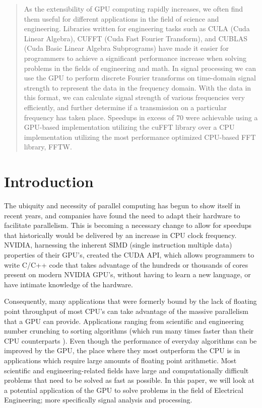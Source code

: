 \documentclass[conference]{IEEEtran}
\begin{document}
\maketitle


\begin{abstract}


As the extensibility of GPU computing rapidly increases, we often find them useful
 for different applications in the field of science and engineering. Libraries
 written for engineering tasks such as CULA (Cuda Linear Algebra), CUFFT (Cuda 
 Fast Fourier Transform), and CUBLAS (Cuda Basic Linear Algebra Subprograms) have
 made it easier for programmers to achieve a significant performance increase when
 solving problems in the fields of engineering and math. In signal processing we can
 use the GPU to perform discrete Fourier transforms on time-domain signal strength
 to represent the data in the frequency domain. With the data in this format, we can 
 calculate signal strength of various frequencies very efficiently, and further determine
 if a transmission on a particular frequency has taken place. Speedups in excess of 70
 were achievable using a GPU-based implementation utilizing the cuFFT library over a CPU
 implementation utilizing the most performance optimized CPU-based FFT library, FFTW.

\end{abstract}

\IEEEpeerreviewmaketitle

\section{Introduction}

The ubiquity and necessity of parallel computing has begun to show itself
in recent years, and companies have found the need to adapt their hardware to
facilitate parallelism. This is becoming a necessary change to allow for
speedups that historically would be delivered by an increase in CPU clock
frequency. NVIDIA, harnessing the inherent SIMD (single instruction multiple data)
properties of their GPU's, created the CUDA API, which allows programmers
to write C/C++ code that takes advantage of the hundreds or thousands of 
cores present on modern NVIDIA GPU's, without having to learn a new language,
or have intimate knowledge of the hardware. 

Consequently, many applications that were formerly bound by the lack of floating
point throughput of most CPU's can take advantage of the massive parallelism
that a GPU can provide. Applications ranging from scientific and engineering 
number crunching to sorting algorithms (which run many times faster than their
CPU counterparts \cite{sorting}). Even though the performance of everyday algorithms
can be improved by the GPU, the place where they most outperform the CPU is 
in applications which require large amounts of floating point arithmetic. 
Most scientific and engineering-related fields have large and computationally
difficult problems that need to be solved as fast as possible. In this paper,
we will look at a potential application of the GPU to solve problems in the
field of Electrical Engineering; more specifically signal analysis and processing.
\end{document}
